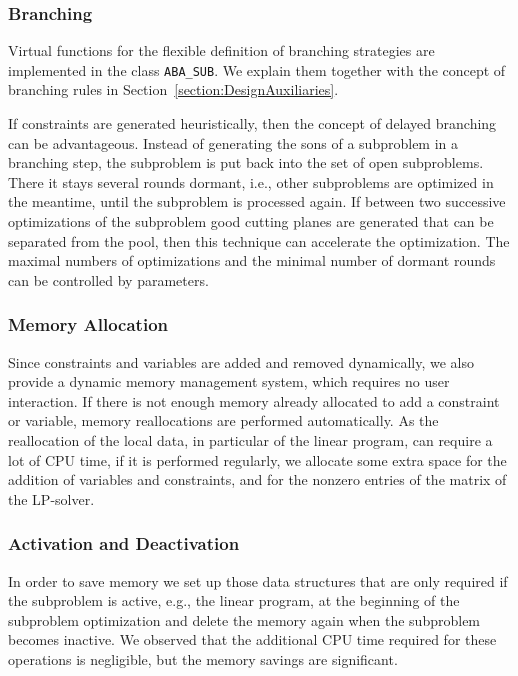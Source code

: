 \subsubsection{Branching}

Virtual functions for the flexible definition of branching strategies
are implemented in the class {\tt ABA\_SUB}. We explain them together
with the concept of branching rules in 
Section~\ref{section:DesignAuxiliaries}.

If constraints are generated heuristically, then the concept of
delayed branching can be advantageous. 
Instead of generating
the sons of a subproblem in a branching step, the subproblem is put
back into the set of open subproblems. There it stays several rounds dormant,
i.e., other subproblems are optimized in the meantime,
until the subproblem is processed again. If between two successive optimizations
of the subproblem good cutting planes are generated that can be separated
from the pool, then this technique can accelerate the optimization.
The maximal numbers of optimizations and the minimal number of dormant rounds
can be controlled by parameters.

\subsubsection{Memory Allocation}

Since constraints and variables are added and removed dynamically,
we also provide a dynamic memory management system, which requires
no user interaction. If there is not enough memory already allocated
to add a constraint or variable, memory reallocations are
performed automatically.
As the reallocation of the local data, in particular of the linear
program, can require a lot of CPU time, if it is performed regularly,
we allocate some extra space for the addition of variables and constraints,
and for the nonzero entries of the matrix of the LP-solver.

\subsubsection{Activation and Deactivation}

In order to save memory we set up those data structures that are only
required if the subproblem is active, e.g., the linear program, 
at the beginning of the subproblem optimization and delete the memory
again when the subproblem becomes inactive. We observed that
the additional CPU time required for these operations is negligible,
but the memory savings are significant.

